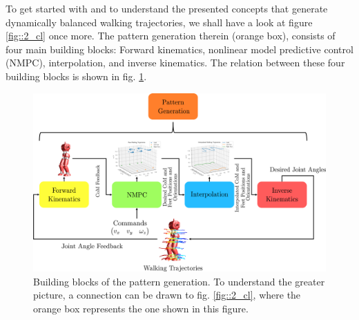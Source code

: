 \FloatBarrier
\label{sec::21_hw}
To get started with and to understand the presented concepts that generate dynamically balanced walking trajectories, we shall have a look at figure \ref{fig::2_cl} once more. The pattern generation therein (orange box), consists of four main building blocks: Forward kinematics, nonlinear model predictive control (NMPC), interpolation, and inverse kinematics. The relation between these four building blocks is shown in fig. \ref{fig::21_pg}.
\begin{figure}[h!]
	\centering
	\includegraphics[scale=.5]{chapters/05_implementing_an_autonomous_walking_pattern_generator/img/pattern_generation.png}
	\caption{Building blocks of the pattern generation. To understand the greater picture, a connection can be drawn to fig. \ref{fig::2_cl}, where the orange box represents the one shown in this figure.}
	\label{fig::21_pg}
\end{figure}
